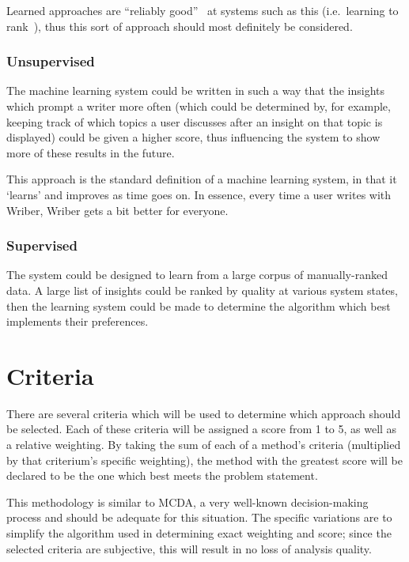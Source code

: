 \documentclass[12pt]{article}
\begin{document}
Learned approaches are ``reliably good''~\cite{bi} at systems such as this (i.e.\ learning to rank~\cite{ltr}), thus this sort of approach should most definitely be considered.

\subsubsection{Unsupervised}
The machine learning system could be written in such a way that the insights which prompt a writer more often (which could be determined by, for example, keeping track of which topics a user discusses after an insight on that topic is displayed) could be given a higher score, thus influencing the system to show more of these results in the future.

This approach is the standard definition of a machine learning system, in that it `learns' and improves as time goes on. In essence, every time a user writes with Wriber, Wriber gets a bit better for everyone.

\subsubsection{Supervised}
The system could be designed to learn from a large corpus of manually-ranked data. A large list of insights could be ranked by quality at various system states, then the learning system could be made to determine the algorithm which best implements their preferences.
\newpage


\section{Criteria}
There are several criteria which will be used to determine which approach should be selected. Each of these criteria will be assigned a score from 1 to 5, as well as a relative weighting. By taking the sum of each of a method's criteria (multiplied by that criterium's specific weighting), the method with the greatest score will be declared to be the one which best meets the problem statement.

This methodology is similar to MCDA, a very well-known decision-making process and should be adequate for this situation. The specific variations are to simplify the algorithm used in determining exact weighting and score; since the selected criteria are subjective, this will result in no loss of analysis quality.
\end{document}
